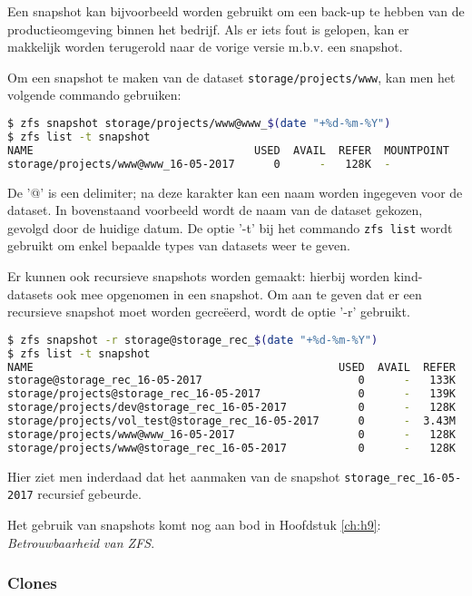 Een snapshot kan bijvoorbeeld worden gebruikt om een back-up te hebben van de productieomgeving binnen het bedrijf. Als er iets fout is gelopen, kan er makkelijk worden terugerold naar de vorige versie m.b.v. een snapshot. 

Om een snapshot te maken van de dataset \texttt{storage/projects/www}, kan men het volgende commando gebruiken:

\begin{lstlisting}[language=bash,style=command_style] 
$ zfs snapshot storage/projects/www@www_$(date "+%d-%m-%Y")
$ zfs list -t snapshot
NAME                                  USED  AVAIL  REFER  MOUNTPOINT
storage/projects/www@www_16-05-2017      0      -   128K  -
\end{lstlisting}

De '@' is een delimiter; na deze karakter kan een naam worden ingegeven voor de dataset. In bovenstaand voorbeeld wordt de naam van de dataset gekozen, gevolgd door de huidige datum. De optie '-t' bij het commando \texttt{zfs list} wordt gebruikt om enkel bepaalde types van datasets weer te geven.

Er kunnen ook recursieve snapshots worden gemaakt: hierbij worden kind-datasets ook mee opgenomen in een snapshot. Om aan te geven dat er een recursieve snapshot moet worden gecreëerd, wordt de optie '-r' gebruikt.

\begin{lstlisting}[language=bash,style=command_style] 
$ zfs snapshot -r storage@storage_rec_$(date "+%d-%m-%Y")
$ zfs list -t snapshot
NAME                                               USED  AVAIL  REFER  MOUNTPOINT
storage@storage_rec_16-05-2017                        0      -   133K  -
storage/projects@storage_rec_16-05-2017               0      -   139K  -
storage/projects/dev@storage_rec_16-05-2017           0      -   128K  -
storage/projects/vol_test@storage_rec_16-05-2017      0      -  3.43M  -
storage/projects/www@www_16-05-2017                   0      -   128K  -
storage/projects/www@storage_rec_16-05-2017           0      -   128K  -
\end{lstlisting}

Hier ziet men inderdaad dat het aanmaken van de snapshot \texttt{storage\_rec\_16-05-2017} recursief gebeurde.

Het gebruik van snapshots komt nog aan bod in Hoofdstuk \ref{ch:h9}: \textit{Betrouwbaarheid van ZFS}.

\subsubsection{Clones}

